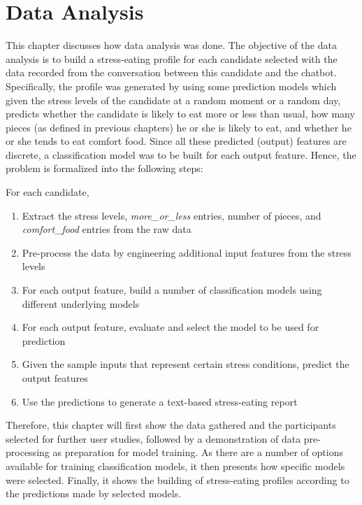
\chapter{Data Analysis}\label{chapter:data_analysis}
This chapter discusses how data analysis was done. The objective of the data analysis is to build a stress-eating profile for each candidate selected with the data recorded from the conversation between this candidate and the chatbot. Specifically, the profile was generated by using some prediction models which given the stress levels of the candidate at a random moment or a random day, predicts whether the candidate is likely to eat more or less than usual, how many pieces (as defined in previous chapters) he or she is likely to eat, and whether he or she tends to eat comfort food. Since all these predicted (output) features are discrete, a classification model was to be built for each output feature. Hence, the problem is formalized into the following steps:\bigskip

\noindent For each candidate,
\begin{enumerate}
  \item Extract the stress levels, \emph{more\_or\_less} entries, number of pieces, and \emph{comfort\_food} entries from the raw data
  \item Pre-process the data by engineering additional input features from the stress levels
  \item For each output feature, build a number of classification models using different underlying models
  \item For each output feature, evaluate and select the model to be used for prediction
  \item Given the sample inputs that represent certain stress conditions, predict the output features
  \item Use the predictions to generate a text-based stress-eating report
\end{enumerate}

Therefore, this chapter will first show the data gathered and the participants selected for further user studies, followed by a demonstration of data pre-processing as preparation for model training. As there are a number of options available for training classification models, it then presents how specific models were selected. Finally, it shows the building of stress-eating profiles according to the predictions made by selected models.


